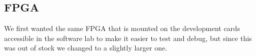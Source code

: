 
\subsection{FPGA}

We first wanted the same FPGA that is mounted on the development cards
accessible in the software lab to make it easier to test and debug, but since
this was out of stock we changed to a slightly larger one.

